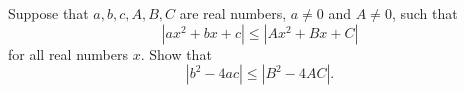 Suppose that $a,b,c,A,B,C$  are real numbers, $a\ne 0$ and $A \ne 0$, such that
\[
          | a x^2 + b x + c | \leq | A x^2 + B x + C |
\]
for all real numbers  $x$. Show that
\[
              | b^2 - 4 a c | \leq | B^2 - 4 A C |.
\]
